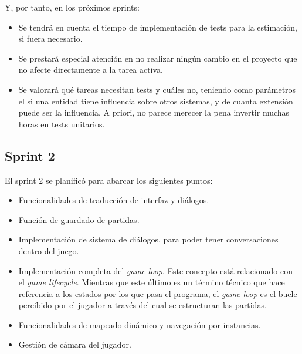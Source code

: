 Y, por tanto, en los próximos sprints:
\begin{itemize}
    \item Se tendrá en cuenta el tiempo de implementación de tests para la estimación, si fuera necesario.
    \item Se prestará especial atención en no realizar ningún cambio en el proyecto que no afecte directamente a la tarea activa.
    \item Se valorará qué tareas necesitan tests y cuáles no, teniendo como parámetros el si una entidad tiene influencia sobre otros sistemas, y de cuanta extensión puede ser la influencia. A priori, no parece merecer la pena invertir muchas horas en tests unitarios.
\end{itemize}

\subsection{Sprint 2}

El sprint 2 se planificó para abarcar los siguientes puntos:

\begin{itemize}
    \item Funcionalidades de traducción de interfaz y diálogos.
    \item Función de guardado de partidas.
    \item Implementación de sistema de diálogos, para poder tener conversaciones dentro del juego.
    \item Implementación completa del \textit{game loop}. Este concepto está relacionado con el \textit{game lifecycle}. Mientras que este último es un término técnico que hace referencia a los estados por los que pasa el programa, el \textit{game loop} es el bucle percibido por el jugador a través del cual se estructuran las partidas.
    \item Funcionalidades de mapeado dinámico y navegación por instancias.
    \item Gestión de cámara del jugador.
\end{itemize}

